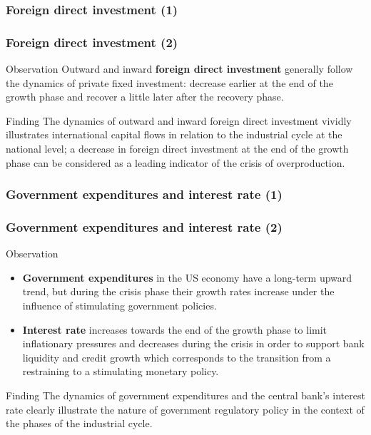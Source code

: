 \begin{frame}
  \frametitle{Foreign direct investment (1)}
  \begin{center}
  \end{center}
\end{frame}

\begin{frame}
  \frametitle{Foreign direct investment (2)}
  \begin{block}{Observation}
    Outward and inward \textbf{foreign direct investment} generally follow the dynamics of private fixed investment: decrease earlier at the end of the growth phase and recover a little later after the recovery phase.
  \end{block}

  \begin{alertblock}{Finding}
    The dynamics of outward and inward foreign direct investment vividly illustrates international capital flows in relation to the industrial cycle at the national level; a decrease in foreign direct investment at the end of the growth phase can be considered as a leading indicator of the crisis of overproduction.
  \end{alertblock}
\end{frame}

\begin{frame}
  \frametitle{Government expenditures and interest rate (1)}
  \begin{center}
  \end{center}
\end{frame}

\begin{frame}
  \frametitle{Government expenditures and interest rate (2)}
  \begin{block}{Observation}
    \begin{itemize}
      \item \textbf{Government expenditures} in the US economy have a long-term upward trend, but during the crisis phase their growth rates increase under the influence of stimulating government policies.
      \item \textbf{Interest rate} increases towards the end of the growth phase to limit inflationary pressures and decreases during the crisis in order to support bank liquidity and credit growth which corresponds to the transition from a restraining to a stimulating monetary policy.
    \end{itemize}
  \end{block}

  \begin{alertblock}{Finding}
    The dynamics of government expenditures and the central bank's interest rate clearly illustrate the nature of government regulatory policy in the context of the phases of the industrial cycle.
  \end{alertblock}
\end{frame}